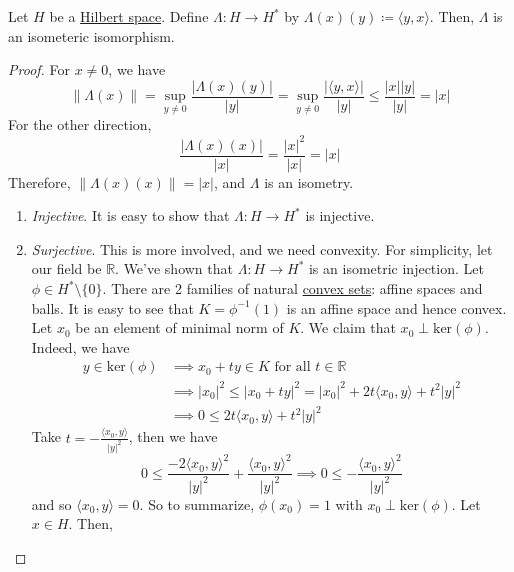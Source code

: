 	\begin{theorem}
	  \label{thm:riesz-representation-theorem}
	  Let $H$ be a \hyperref[def:hilbert-space]{Hilbert space}. Define $\Lambda: H \to H^\ast$ by $\Lambda(x)(y) \coloneqq \langle y, x \rangle$. Then, $\Lambda$ is an isometeric isomorphism. 
	\end{theorem}
	\begin{proof}
	  For $x \neq 0$, we have 
		\begin{equation}
			\|\Lambda (x)\| = \sup_{y \neq 0} \frac{|\Lambda(x)(y)|}{|y|} = \sup_{y \neq 0} \frac{|\langle y, x \rangle|}{|y|} \leq \frac{|x||y|} {|y|} = |x|
		\end{equation}
		For the other direction, 
		\begin{equation}
			\frac{|\Lambda(x)(x)|}{|x|} = \frac{|x|^2}{|x|} = |x|
		\end{equation}
		Therefore, $\|\Lambda(x)(x)\| = |x|$, and $\Lambda$ is an isometry. 
		\begin{enumerate}
		  \item \textit{Injective}. It is easy to show that $\Lambda: H \to H^\ast$ is injective. 
			\item \textit{Surjective}. This is more involved, and we need convexity. For simplicity, let our field be $\mathbb{R}$. We've shown that $\Lambda: H \to H^\ast$ is an isometric injection. Let $\phi \in H^\ast \setminus \{0\}$. There are 2 families of natural \hyperref[st-def:convex-sets]{convex sets}: affine spaces and balls. It is easy to see that $K = \phi^{-1} (1)$ is an affine space and hence convex. Let $x_0$ be an element of minimal norm of $K$. We claim that $x_0 \perp \mathrm{ker}(\phi)$. Indeed, we have 
				\begin{align}
					y \in \mathrm{ker}(\phi) & \implies x_0 + ty \in K \text{ for all } t \in \mathbb{R} \\ 
																	 & \implies |x_0|^2 \leq |x_0 + ty|^2 = |x_0|^2 + 2t \langle x_0, y \rangle + t^2 |y|^2 \\ 
																	 & \implies 0 \leq 2t \langle x_0, y \rangle + t^2 |y|^2
				\end{align}
				Take $t = -\frac{\langle x_0, y \rangle}{|y|^2}$, then we have 
				\begin{equation}
					0 \leq \frac{-2 \langle x_0, y \rangle^2}{|y|^2} + \frac{\langle x_0, y \rangle^2}{|y|^2} \implies 0 \leq - \frac{\langle x_0, y \rangle^2}{|y|^2} 
				\end{equation}
				and so $\langle x_0, y \rangle = 0$. So to summarize, $\phi(x_0) = 1$ with $x_0 \perp \mathrm{ker}(\phi)$. Let $x \in H$. Then, 

\end{enumerate}
\end{proof}
